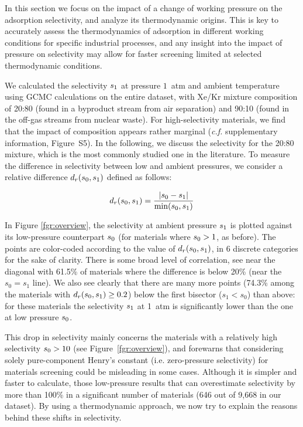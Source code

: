 \documentclass[main.tex]{subfiles}
\begin{document}
  In this section we focus on the impact of a change of working pressure on the adsorption selectivity, and analyze its thermodynamic origins. This is key to accurately assess the thermodynamics of adsorption in different working conditions for specific industrial processes, and any insight into the impact of pressure on selectivity may allow for faster screening limited at selected thermodynamic conditions.
  
  We calculated the selectivity $s_{\text{1}}$ at pressure $1$~atm and ambient temperature using GCMC calculations on the entire dataset, with Xe/Kr mixture composition of 20:80 (found in a byproduct stream from air separation\cite{kerry2007industrial}) and 90:10 (found in the off-gas streams from nuclear waste\cite{auerbach2003handbook}). For high-selectivity materials, we find that the impact of composition appears rather marginal (\emph{c.f.} supplementary information, Figure~S5). In the following, we discuss the selectivity for the 20:80 mixture, which is the most commonly studied one in the literature. To measure the difference in selectivity between low and ambient pressures, we consider a relative difference $d_r(s_{\text{0}},s_{\text{1}})$ defined as follows:
  
  \begin{equation} \label{eqn:reldiff}
      d_r(s_{\text{0}},s_{\text{1}}) = \dfrac{\lvert s_{\text{0}} - s_{\text{1}} \rvert}{\min(s_{\text{0}},s_{\text{1}})}
  \end{equation}
  
  In Figure \ref{fgr:overview}, the selectivity at ambient pressure $s_{\text{1}}$ is plotted against its low-pressure counterpart $s_{\text{0}}$ (for materials where $s_{\text{0}} > 1$, as before). The points are color-coded according to the value of $d_r(s_{\text{0}},s_{\text{1}})$, in 6 discrete categories for the sake of clarity. There is some broad level of correlation, see near the diagonal with {61.5\%} of materials where the difference is below {20\%} (near the $s_0 = s_1$ line). We also see clearly that there are many more points ({74.3\%} among the materials with $d_r(s_{\text{0}},s_{\text{1}})\ge 0.2$) below the first bisector ($s_1 < s_0$) than above: for these materials the selectivity $s_{\text{1}}$ at 1~atm is significantly lower than the one at low pressure $s_{\text{0}}$.
  
  This drop in selectivity mainly concerns the materials with a relatively high selectivity $s_{\text{0}} > 10$ (see Figure~\ref{fgr:overview}), and forewarns that considering solely pure-component Henry's constant (i.e. zero-pressure selectivity) for materials screening could be misleading in some cases. Although it is simpler and faster to calculate, those low-pressure results that can overestimate selectivity by more than {100\%} in a significant number of materials (646 out of 9,668 in our dataset). By using a thermodynamic approach, we now try to explain the reasons behind these shifts in selectivity.
  
\end{document}
